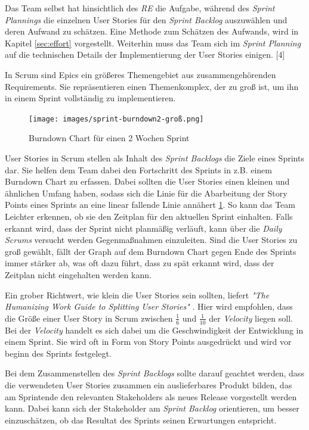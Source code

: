 \documentclass[acmtog]{acmart}
\begin{document}
Das Team selbst hat hinsichtlich des \emph{RE} die Aufgabe, während des \emph{Sprint Plannings} die einzelnen User Stories für den \emph{Sprint 
Backlog} auszuwählen und deren Aufwand zu schätzen. Eine Methode zum Schätzen des Aufwands, wird in Kapitel \ref{sec:effort} vorgestellt. 
Weiterhin muss das Team sich im \emph{Sprint Planning} auf die technischen Details der Implementierung der User Stories einigen. [4]

In Scrum sind Epics ein größeres Themengebiet aus zusammengehörenden Requirements. Sie repräsentieren einen Themenkomplex, der 
zu groß ist, um ihn in einem Sprint vollständig zu implementieren. \cite{reinscrum}

\begin{figure}[t]
  \centering
  \texttt{[image: images/sprint-burndown2-groß.png]}
  \caption{Burndown Chart für einen 2 Wochen Sprint}
    \label{fig:burndownchart}
  \Description{}
\end{figure}

User Stories in Scrum stellen als Inhalt des \emph{Sprint Backlogs} die Ziele eines Sprints dar. Sie helfen dem Team dabei den Fortschritt 
des Sprints in z.B. einem Burndown Chart zu erfassen. Dabei sollten die User Stories einen kleinen und ähnlichen Umfang haben, sodass 
sich die Linie für die Abarbeitung der Story Points eines Sprints an eine linear fallende Linie annähert \ref{fig:burndownchart}. So kann das 
Team Leichter erkennen, ob sie den Zeitplan für den aktuellen Sprint einhalten. Falls erkannt wird, dass der Sprint nicht planmäßig 
verläuft, kann über die \emph{Daily Scrums} versucht werden Gegenmaßnahmen einzuleiten. Sind die User Stories zu groß gewählt, fällt der 
Graph auf dem Burndown Chart gegen Ende des Sprints immer stärker ab, was oft dazu führt, dass zu spät erkannt wird, dass der Zeitplan 
nicht eingehalten werden kann. \cite{reinscrum} 

Ein grober Richtwert, wie klein die User Stories sein sollten, liefert \emph{"The Humanizing Work Guide to Splitting User Stories"} \cite{humanizingwork}. Hier wird empfohlen, dass die Größe einer User Story in 
Scrum zwischen \( \frac{1}{6} \) und \( \frac{1}{10} \) der \emph{Velocity} liegen soll. Bei der \emph{Velocity} handelt 
es sich dabei um die Geschwindigkeit der Entwicklung in einem Sprint. Sie wird oft in Form von Story Points ausgedrückt und wird vor 
beginn des Sprints festgelegt. \cite{humanizingwork}

Bei dem Zusammenstellen des \emph{Sprint Backlogs} sollte darauf geachtet werden, dass die verwendeten User Stories zusammen ein auslieferbares 
Produkt bilden, das am Sprintende den relevanten Stakeholders als neues Release vorgestellt werden kann. Dabei kann sich der Stakeholder 
am \emph{Sprint Backlog} orientieren, um besser einzuschätzen, ob das Resultat des Sprints seinen Erwartungen entspricht. \cite{reinscrum}
\end{document}
